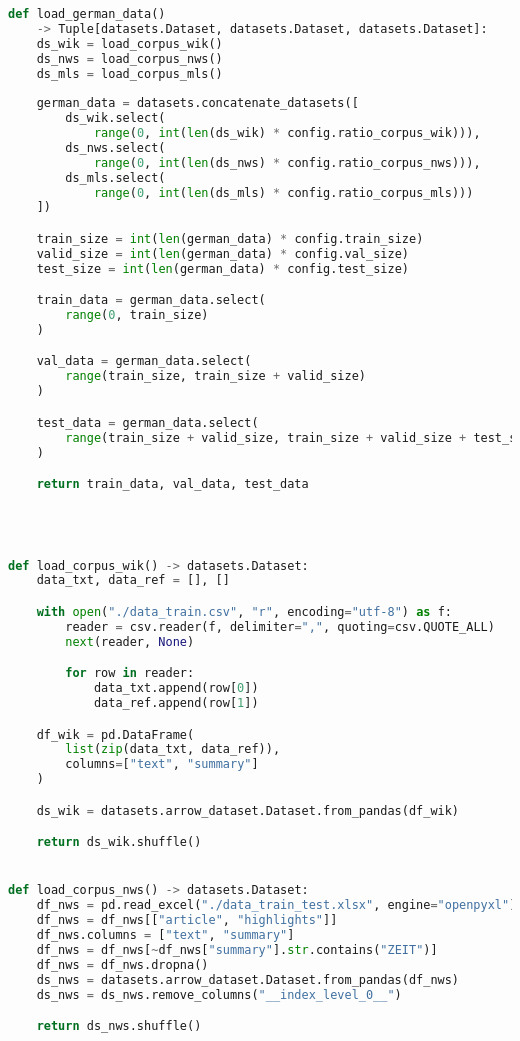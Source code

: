 \begin{lstlisting}[language=Python, caption=Hilfsmethoden]
def load_german_data()
	-> Tuple[datasets.Dataset, datasets.Dataset, datasets.Dataset]:
    ds_wik = load_corpus_wik()
    ds_nws = load_corpus_nws()
    ds_mls = load_corpus_mls()
    
    german_data = datasets.concatenate_datasets([
        ds_wik.select(
            range(0, int(len(ds_wik) * config.ratio_corpus_wik))),
        ds_nws.select(
            range(0, int(len(ds_nws) * config.ratio_corpus_nws))),
        ds_mls.select(
            range(0, int(len(ds_mls) * config.ratio_corpus_mls)))
    ])

    train_size = int(len(german_data) * config.train_size)
    valid_size = int(len(german_data) * config.val_size)
    test_size = int(len(german_data) * config.test_size)

    train_data = german_data.select(
        range(0, train_size)
    )

    val_data = german_data.select(
        range(train_size, train_size + valid_size)
    )

    test_data = german_data.select(
        range(train_size + valid_size, train_size + valid_size + test_size)
    )

    return train_data, val_data, test_data




def load_corpus_wik() -> datasets.Dataset:
    data_txt, data_ref = [], []

    with open("./data_train.csv", "r", encoding="utf-8") as f:
        reader = csv.reader(f, delimiter=",", quoting=csv.QUOTE_ALL)
        next(reader, None)

        for row in reader:
            data_txt.append(row[0])
            data_ref.append(row[1])

    df_wik = pd.DataFrame(
        list(zip(data_txt, data_ref)),
        columns=["text", "summary"]
    )

    ds_wik = datasets.arrow_dataset.Dataset.from_pandas(df_wik)

    return ds_wik.shuffle()


def load_corpus_nws() -> datasets.Dataset:
    df_nws = pd.read_excel("./data_train_test.xlsx", engine="openpyxl")
    df_nws = df_nws[["article", "highlights"]]
    df_nws.columns = ["text", "summary"]
    df_nws = df_nws[~df_nws["summary"].str.contains("ZEIT")]
    df_nws = df_nws.dropna()
    ds_nws = datasets.arrow_dataset.Dataset.from_pandas(df_nws)
    ds_nws = ds_nws.remove_columns("__index_level_0__")

    return ds_nws.shuffle()






\end{lstlisting}
